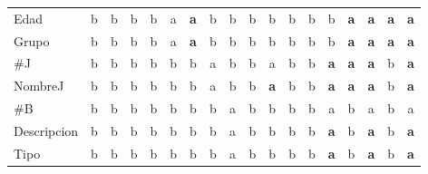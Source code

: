 {\begin{longtable}{lccccccccccccccccc}
Edad & \color{grisclaro}b & \color{grisclaro}b & \color{grisclaro}b & \color{grisclaro}b & a & \textbf{\color{azuldos}a} & \color{grisclaro}b & \color{grisclaro}b & \color{grisclaro}b & \color{grisclaro}b & \color{grisclaro}b & \color{grisclaro}b & \color{grisclaro}b & \textbf{\color{azuldos}a} & \textbf{\color{azuldos}a} & \textbf{\color{azuldos}a} & \textbf{\color{azuldos}a} \\
Grupo & \color{grisclaro}b & \color{grisclaro}b & \color{grisclaro}b & \color{grisclaro}b & a & \textbf{\color{azuldos}a} & \color{grisclaro}b & \color{grisclaro}b & \color{grisclaro}b & \color{grisclaro}b & \color{grisclaro}b & \color{grisclaro}b & \color{grisclaro}b & \textbf{\color{azuldos}a} & \textbf{\color{azuldos}a} & \textbf{\color{azuldos}a} & \textbf{\color{azuldos}a} \\
\#J & \color{grisclaro}b & \color{grisclaro}b & \color{grisclaro}b & \color{grisclaro}b & \color{grisclaro}b & \color{grisclaro}b & a & \color{grisclaro}b & \color{grisclaro}b & a & \color{grisclaro}b & \color{grisclaro}b & \textbf{\color{azuldos}a} & \textbf{\color{azuldos}a} & \textbf{\color{azuldos}a} & \color{grisclaro}b & \textbf{\color{azuldos}a} \\
NombreJ & \color{grisclaro}b & \color{grisclaro}b & \color{grisclaro}b & \color{grisclaro}b & \color{grisclaro}b & \color{grisclaro}b & a & \color{grisclaro}b & \color{grisclaro}b & \textbf{\color{azuldos}a} & \color{grisclaro}b & \color{grisclaro}b & \textbf{\color{azuldos}a} & \textbf{\color{azuldos}a} & \textbf{\color{azuldos}a} & \color{grisclaro}b & \textbf{\color{azuldos}a} \\
\#B & \color{grisclaro}b & \color{grisclaro}b & \color{grisclaro}b & \color{grisclaro}b & \color{grisclaro}b & \color{grisclaro}b & \color{grisclaro}b & a & \color{grisclaro}b & \color{grisclaro}b & \color{grisclaro}b & \color{grisclaro}b & a & \color{grisclaro}b & a & \color{grisclaro}b & a \\
Descripcion & \color{grisclaro}b & \color{grisclaro}b & \color{grisclaro}b & \color{grisclaro}b & \color{grisclaro}b & \color{grisclaro}b & \color{grisclaro}b & a & \color{grisclaro}b & \color{grisclaro}b & \color{grisclaro}b & \color{grisclaro}b & \textbf{\color{azuldos}a} & \color{grisclaro}b & \textbf{\color{azuldos}a} & \color{grisclaro}b & \textbf{\color{azuldos}a} \\
Tipo & \color{grisclaro}b & \color{grisclaro}b & \color{grisclaro}b & \color{grisclaro}b & \color{grisclaro}b & \color{grisclaro}b & \color{grisclaro}b & a & \color{grisclaro}b & \color{grisclaro}b & \color{grisclaro}b & \color{grisclaro}b & \textbf{\color{azuldos}a} & \color{grisclaro}b & \textbf{\color{azuldos}a} & \color{grisclaro}b & \textbf{\color{azuldos}a} \\

\end{longtable}}
